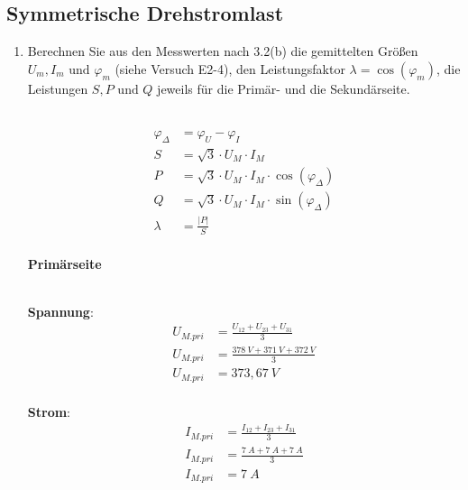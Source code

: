\subsection{Symmetrische Drehstromlast}
\begin{enumerate}[label=\alph*)]

	\item Berechnen Sie aus den Messwerten nach 3.2(b) die gemittelten Größen $U_m, I_m
		      \text{ und } \varphi_m$ (siehe Versuch E2-4), den Leistungsfaktor $\lambda =
		      \cos(\varphi_m)$, die Leistungen $S, P \text{ und } Q$ jeweils für die Primär-
	      und die Sekundärseite.\\ \ \\
	      \begin{center}
		      \begin{align*}
			      \varphi_{\Delta} & = \varphi_{U} - \varphi_{I}                             \\
			      S                & = \sqrt{3}\cdot U_M\cdot I_M                            \\
			      P                & = \sqrt{3}\cdot U_M\cdot I_M\cdot\cos(\varphi_{\Delta}) \\
			      Q                & = \sqrt{3}\cdot U_M\cdot I_M\cdot\sin(\varphi_{\Delta}) \\
			      \lambda          & = \frac{|P|}{S}                                         \\
		      \end{align*}
	      \end{center}

	      \textbf{Primärseite}\\ \ \\

	      \begin{tcolorbox}[colback=gray!30,
			      colframe=black,
			      width=0.9\textwidth,
		      ]
		      \parbox{\textwidth}{

			      \begin{minipage}{0.5\textwidth}
				      \textbf{Spannung}:
				      \begin{align*}
					      U_{M.pri} & = \frac{U_{12} + U_{23} + U_{31}}{3} \\
					      U_{M.pri} & = \frac{378\ V + 371\ V + 372\ V}{3} \\
					      U_{M.pri} & = 373,67\ V                          \\
				      \end{align*}
			      \end{minipage}\hfill
			      \begin{minipage}{0.5\textwidth}
				      \textbf{Strom}:
				      \begin{align*}
					      I_{M.pri} & = \frac{I_{12} + I_{23} + I_{31}}{3} \\
					      I_{M.pri} & = \frac{7\ A + 7\ A + 7\ A}{3}       \\
					      I_{M.pri} & = 7\ A                               \\
				      \end{align*}
			      \end{minipage}
		      }
	      \end{tcolorbox}


\end{enumerate}
